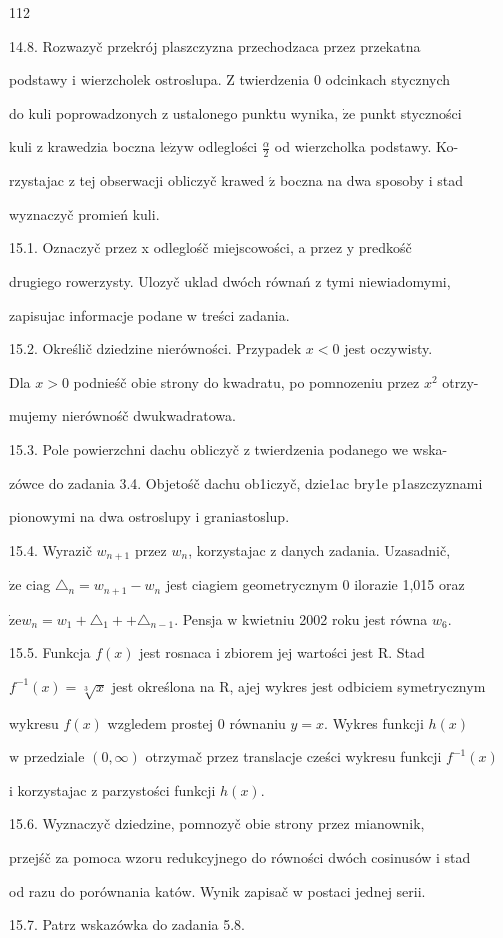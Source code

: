 \documentclass[a4paper,12pt]{article}
\begin{document}
112

14.8. Rozwazyč przekrój plaszczyzna przechodzaca przez przekatna

podstawy $\mathrm{i}$ wierzcholek ostroslupa. $\mathrm{Z}$ twierdzenia $0$ odcinkach stycznych

do kuli poprowadzonych $\mathrm{z}$ ustalonego punktu wynika, $\dot{\mathrm{z}}\mathrm{e}$ punkt styczności

kuli $\mathrm{z}$ krawedzia boczna $\mathrm{l}\mathrm{e}\dot{\mathrm{z}}\mathrm{y}\mathrm{w}$ odleglości $\displaystyle \frac{\alpha}{2}$ od wierzcholka podstawy. Ko-

rzystajac $\mathrm{z}$ tej obserwacji obliczyč krawed $\acute{\mathrm{z}}$ boczna na dwa sposoby $\mathrm{i}$ stad

wyznaczyč promień kuli.

15.1. Oznaczyč przez x odleglośč miejscowości, a przez y predkośč

drugiego rowerzysty. Ulozyč uklad dwóch równań z tymi niewiadomymi,

zapisujac informacje podane w treści zadania.

15.2. Określič dziedzine nierówności. Przypadek $x<0$ jest oczywisty.

Dla $x>0$ podnieśč obie strony do kwadratu, po pomnozeniu przez $x^{2}$ otrzy-

mujemy nierównośč dwukwadratowa.

15.3. Pole powierzchni dachu obliczyč z twierdzenia podanego we wska-

zówce do zadania 3.4. Objetośč dachu ob1iczyč, dzie1ac bry1e p1aszczyznami

pionowymi na dwa ostroslupy i graniastoslup.

15.4. Wyrazič $w_{n+1}$ przez $w_{n}$, korzystajac $\mathrm{z}$ danych zadania. Uzasadnič,

$\dot{\mathrm{z}}\mathrm{e}$ ciag $\triangle_{n}=w_{n+1}-w_{n}$ jest ciagiem geometrycznym $0$ ilorazie 1,015 oraz

$\dot{\mathrm{z}}\mathrm{e}w_{n}=w_{1}+\triangle_{1}+ +\triangle_{n-1}$. Pensja $\mathrm{w}$ kwietniu 2002 roku jest równa $w_{6}.$

15.5. Funkcja $f(x)$ jest rosnaca $\mathrm{i}$ zbiorem jej wartości jest R. Stad

$f^{-1}(x)=\sqrt[3]{x}$ jest określona na $\mathrm{R}$, ajej wykres jest odbiciem symetrycznym

wykresu $f(x)$ wzgledem prostej $0$ równaniu $y = x$. Wykres funkcji $h(x)$

$\mathrm{w}$ przedziale $(0,\infty)$ otrzymač przez translacje cześci wykresu funkcji $f^{-1}(x)$

$\mathrm{i}$ korzystajac $\mathrm{z}$ parzystości funkcji $h(x).$

15.6. Wyznaczyč dziedzine, pomnozyč obie strony przez mianownik,

przejśč za pomoca wzoru redukcyjnego do równości dwóch cosinusów i stad

od razu do porównania katów. Wynik zapisač w postaci jednej serii.

15.7. Patrz wskazówka do zadania 5.8.
\end{document}
